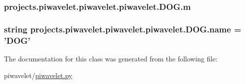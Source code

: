 \hypertarget{classprojects_1_1piwavelet_1_1piwavelet_1_1piwavelet_1_1DOG_ab3b0e7f992bc07e670e7fcd28e2be7ce}{
\subsubsection[{m}]{\setlength{\rightskip}{0pt plus 5cm}projects.\-piwavelet.\-piwavelet.\-piwavelet.\-D\-O\-G.\-m}}\label{classprojects_1_1piwavelet_1_1piwavelet_1_1piwavelet_1_1DOG_ab3b0e7f992bc07e670e7fcd28e2be7ce}
\hypertarget{classprojects_1_1piwavelet_1_1piwavelet_1_1piwavelet_1_1DOG_a54681196aab116d55dc5a4eb1a521d39}{
\subsubsection[{name}]{\setlength{\rightskip}{0pt plus 5cm}string projects.\-piwavelet.\-piwavelet.\-piwavelet.\-D\-O\-G.\-name = '{\bf D\-O\-G}'\hspace{0.3cm}{\ttfamily [static]}}}\label{classprojects_1_1piwavelet_1_1piwavelet_1_1piwavelet_1_1DOG_a54681196aab116d55dc5a4eb1a521d39}


The documentation for this class was generated from the following file\-:\begin{DoxyCompactItemize}
\item 
piwavelet/\hyperlink{piwavelet_8py}{piwavelet.\-py}\end{DoxyCompactItemize}

